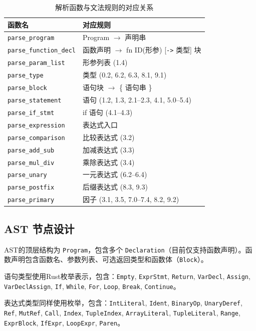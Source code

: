 \documentclass[12pt,a4paper]{ctexart}
\begin{document}
\begin{table}[H]
\centering
\small
\caption{解析函数与文法规则的对应关系}
\begin{tabular}{ll}
\toprule
\textbf{函数名} & \textbf{对应规则} \\
\midrule
\texttt{parse\_program} & Program $\to$ 声明串 \\
\texttt{parse\_function\_decl} & 函数声明 $\to$ fn ID(形参) [\texttt{->} 类型] 块 \\
\texttt{parse\_param\_list} & 形参列表 (1.4) \\
\texttt{parse\_type} & 类型 (0.2, 6.2, 6.3, 8.1, 9.1) \\
\texttt{parse\_block} & 语句块 $\to$ \{ 语句串 \} \\
\texttt{parse\_statement} & 语句 (1.2, 1.3, 2.1--2.3, 4.1, 5.0--5.4) \\
\texttt{parse\_if\_stmt} & if 语句 (4.1--4.3) \\
\texttt{parse\_expression} & 表达式入口 \\
\texttt{parse\_comparison} & 比较表达式 (3.2) \\
\texttt{parse\_add\_sub} & 加减表达式 (3.3) \\
\texttt{parse\_mul\_div} & 乘除表达式 (3.4) \\
\texttt{parse\_unary} & 一元表达式 (6.2--6.4) \\
\texttt{parse\_postfix} & 后缀表达式 (8.3, 9.3) \\
\texttt{parse\_primary} & 因子 (3.1, 3.5, 7.0--7.4, 8.2, 9.2) \\
\bottomrule
\end{tabular}
\end{table}

\subsection{AST 节点设计}

AST的顶层结构为 \texttt{Program}，包含多个 \texttt{Declaration}（目前仅支持函数声明）。函数声明包含函数名、参数列表、可选返回类型和函数体（\texttt{Block}）。

语句类型使用Rust枚举表示，包含：\texttt{Empty}, \texttt{ExprStmt}, \texttt{Return}, \texttt{VarDecl}, \texttt{Assign}, \texttt{VarDeclAssign}, \texttt{If}, \texttt{While}, \texttt{For}, \texttt{Loop}, \texttt{Break}, \texttt{Continue}。

表达式类型同样使用枚举，包含：\texttt{IntLiteral}, \texttt{Ident}, \texttt{BinaryOp}, \texttt{UnaryDeref}, \texttt{Ref}, \texttt{MutRef}, \texttt{Call}, \texttt{Index}, \texttt{TupleIndex}, \texttt{ArrayLiteral}, \texttt{TupleLiteral}, \texttt{Range}, \texttt{ExprBlock}, \texttt{IfExpr}, \texttt{LoopExpr}, \texttt{Paren}。
\end{document}
